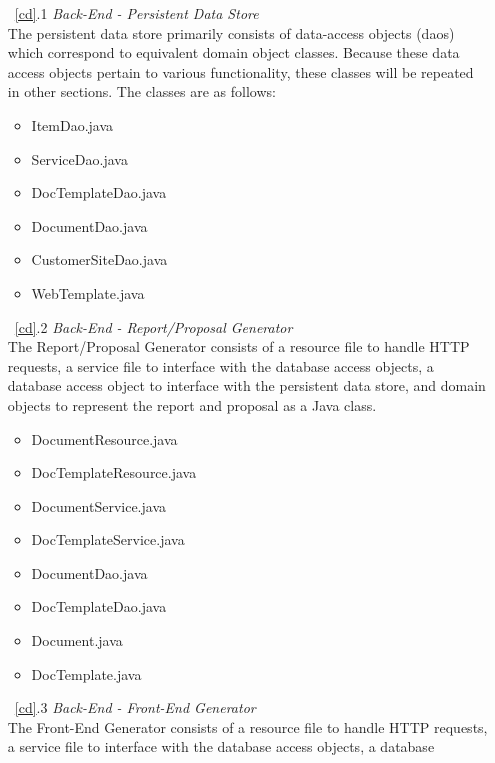 \documentclass{article}
\newcommand{\br}{\vspace{2mm}}
\begin{document}
\begin{enumerate}
    \item[~\ref{cd}.1 ] \emph{Back-End - Persistent Data Store}\br\\
        The persistent data store primarily consists of data-access objects (daos)
        which correspond to equivalent domain object classes.  Because these data
        access objects pertain to various functionality, these classes will be
        repeated in other sections.  The classes are as follows:
        \begin{itemize}
            \item ItemDao.java
            \item ServiceDao.java
            \item DocTemplateDao.java
            \item DocumentDao.java
            \item CustomerSiteDao.java
            \item WebTemplate.java
        \end{itemize}
    \item[~\ref{cd}.2 ] \emph{Back-End - Report/Proposal Generator}\br\\
        The Report/Proposal Generator consists of a resource file to handle HTTP
        requests, a service file to interface with the database access objects,
        a database access object to interface with the persistent data store,
        and domain objects to represent the report and proposal as a Java class.
        \begin{itemize}
            \item DocumentResource.java
            \item DocTemplateResource.java
            \item DocumentService.java
            \item DocTemplateService.java
            \item DocumentDao.java
            \item DocTemplateDao.java
            \item Document.java
            \item DocTemplate.java
        \end{itemize}
    \item[~\ref{cd}.3 ] \emph{Back-End - Front-End Generator}\br\\
        The Front-End Generator consists of a resource file to handle HTTP requests,
        a service file to interface with the database access objects, a database

\end{enumerate}
\end{document}
